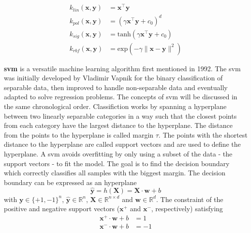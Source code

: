 \begin{align}
    \label{eq:lin-kernel}
    k_{lin}(\mathbf{x},\mathbf{y}) &= \mathbf{x}^{\top} \mathbf{y} \\
    \label{eq:pol-kernel}
    k_{pol}(\mathbf{x}, \mathbf{y}) &= (\gamma \mathbf{x}^{\top} \mathbf{y} + c_0)^d \\
    \label{eq:sig-kernel}
    k_{sig}(\mathbf{x}, \mathbf{y}) &= \text{tanh}(\gamma \mathbf{x}^{\top} \mathbf{y} + c_0) \\
    \label{eq:rbf-kernel}
    k_{rbf}(\mathbf{x}, \mathbf{y}) &= \text{exp}(- \gamma \| \mathbf{x} -  \mathbf{y} \|^2) 
\end{align}

\textbf{\Gls{svm}} is a versatile machine learning algorithm first mentioned in 1992\cite{boser1992training}. 
%
The \gls{svm} was initially developed by Vladimir Vapnik for the binary classification of separable data, then improved to handle non-separable data\cite{cortes1995support} and eventually adapted to solve regression problems\cite{drucker1996support}.
The concepts of \gls{svm} will be discussed in the same chronological order. 
%
Classifiction works by spanning a hyperplane between two linearly separable categories in a way such that the closest points from each category have the largest distance to the hyperplane. 
The distance from the points to the hyperplane is called margin $\tau$.
The points with the shortest distance to the hyperplane are called support vectors and are used to define the hyperplane.
A \gls{svm} avoids overfitting by only using a subset of the data - the support vectors - to fit the model. 
The goal is to find the decision boundary which correctly classifies all samples with the biggest margin. 
%
The decision boundary can be expressed as an hyperplane
\begin{equation}
	\hat{\mathbf{y}} = h(\mathbf{X}) = \mathbf{X} \cdot \mathbf{w} + b
\end{equation}
with 
$\mathbf{y} \in \lbrace +1, -1 \rbrace^n$, 
$\hat{\mathbf{y}} \in \mathbb{R}^n$,
$\mathbf{X} \in \mathbb{R}^{n \times d}$ and
$\mathbf{w} \in \mathbb{R}^d$.
The constraint of the positive and negative support vectors ($\mathbf{x}^+$ and $\mathbf{x}^-$, respectively) satisfying
\begin{align}
	\mathbf{x}^+ \cdot \mathbf{w} + b &= 1 \\
	\mathbf{x}^- \cdot \mathbf{w} + b &= -1 
\end{align}
